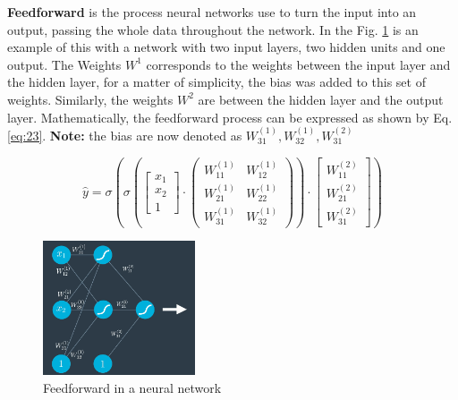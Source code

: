 \documentclass{article}
\begin{document}
\textbf{Feedforward} is the process neural networks use to turn the input into an output, passing the whole data throughout the network. In the Fig. \ref{fig:f31} is an example of this with a network with two input layers, two hidden units and one output. The Weights \(W^{1}\) corresponds to the weights between the input layer and the hidden layer, for a matter of simplicity, the bias was added to this set of weights. Similarly, the weights \(W^{2}\) are between the hidden layer and the output layer. Mathematically, the feedforward process can be expressed as shown by Eq. \eqref{eq:23}. \textbf{Note:} the bias are now denoted as \(W_{31}^{(1)}, W_{32}^{(1)}, W_{31}^{(2)}\)

\begin{equation}
\label{eq:23}
\hat{y} = \sigma(\sigma (\begin{bmatrix}
           x_{1} \\
           x_{2} \\
           1
         \end{bmatrix} \cdot \begin{pmatrix}
                                W_{11}^{(1)} & W_{12}^{(1)} \\
                                W_{21}^{(1)} & W_{22}^{(1)} \\
                                W_{31}^{(1)} & W_{32}^{(1)}
                                \end{pmatrix} ) \cdot \begin{bmatrix}
                                                           W_{11}^{(2)} \\
                                                           W_{21}^{(2)} \\
                                                           W_{31}^{(2)}
                                                         \end{bmatrix})
\end{equation}

\begin{figure}[ht]
    \centering
    \includegraphics[width=0.4\textwidth,height=0.4\textheight,keepaspectratio]{images/feedforward.png}
    \captionsetup{justification=centering}
    \caption{Feedforward in a neural network}
    \label{fig:f31}
\end{figure}
\end{document}

